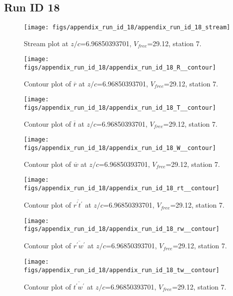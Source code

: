 \subsection{Run ID 18}
\begin{figure}[H]
\centering
\texttt{[image: figs/appendix\_run\_id\_18/appendix\_run\_id\_18\_stream]}
\caption{Stream plot at $z/c$=6.96850393701, $V_{free}$=29.12, station 7.}
\label{fig:appendix_run_id_18_stream}
\end{figure}


\begin{figure}[H]
\centering
\texttt{[image: figs/appendix\_run\_id\_18/appendix\_run\_id\_18\_R\_\_contour]}
\caption{Contour plot of $\overline{r}$ at $z/c$=6.96850393701, $V_{free}$=29.12, station 7.}
\label{fig:appendix_run_id_18_R__contour}
\end{figure}


\begin{figure}[H]
\centering
\texttt{[image: figs/appendix\_run\_id\_18/appendix\_run\_id\_18\_T\_\_contour]}
\caption{Contour plot of $\overline{t}$ at $z/c$=6.96850393701, $V_{free}$=29.12, station 7.}
\label{fig:appendix_run_id_18_T__contour}
\end{figure}


\begin{figure}[H]
\centering
\texttt{[image: figs/appendix\_run\_id\_18/appendix\_run\_id\_18\_W\_\_contour]}
\caption{Contour plot of $\overline{w}$ at $z/c$=6.96850393701, $V_{free}$=29.12, station 7.}
\label{fig:appendix_run_id_18_W__contour}
\end{figure}


\begin{figure}[H]
\centering
\texttt{[image: figs/appendix\_run\_id\_18/appendix\_run\_id\_18\_rt\_\_contour]}
\caption{Contour plot of $\overline{r^\prime t^\prime}$ at $z/c$=6.96850393701, $V_{free}$=29.12, station 7.}
\label{fig:appendix_run_id_18_rt__contour}
\end{figure}


\begin{figure}[H]
\centering
\texttt{[image: figs/appendix\_run\_id\_18/appendix\_run\_id\_18\_rw\_\_contour]}
\caption{Contour plot of $\overline{r^\prime w^\prime}$ at $z/c$=6.96850393701, $V_{free}$=29.12, station 7.}
\label{fig:appendix_run_id_18_rw__contour}
\end{figure}


\begin{figure}[H]
\centering
\texttt{[image: figs/appendix\_run\_id\_18/appendix\_run\_id\_18\_tw\_\_contour]}
\caption{Contour plot of $\overline{t^\prime w^\prime}$ at $z/c$=6.96850393701, $V_{free}$=29.12, station 7.}
\label{fig:appendix_run_id_18_tw__contour}
\end{figure}


